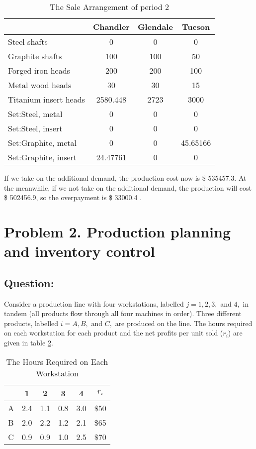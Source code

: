 \documentclass[12pt]{article}
\begin{document}
\begin{table}[H]
	\centering
	\setlength{\belowcaptionskip}{0.1cm}
	\caption{The Sale Arrangement of period 2}
	\label{tab22}
	\begin{tabular}{lccc}
		\hline
		\hline
		&Chandler&Glendale&	Tucson\\
		\hline
		Steel shafts& 0&0&0\\
		Graphite shafts& 100&100&50\\
		Forged iron heads&200&200&100\\
		Metal wood heads&30&30&15\\
		Titanium insert heads&2580.448&2723&3000\\
		Set:Steel, metal&0&0&0\\
		Set:Steel, insert&0&0&0\\
		Set:Graphite, metal&0&0&45.65166\\
		Set:Graphite, insert&24.47761&0&0\\
		\hline
		\hline
	\end{tabular}
\end{table}
\noindent If we take on the additional demand, the production cost now is \$ 535457.3. At the meanwhile, if we not take on the additional demand, the production will cost \$ 502456.9, so the overpayment is \$ 33000.4 .
	\section{Problem 2. Production planning and inventory control}
	\subsection{Question:}

	\noindent Consider a production line with four workstations, labelled $j = 1, 2, 3,$ and $4,$ in tandem (all products flow through all four machines in order). Three different products, labelled $i = A, B,$ and $C,$ are produced on the line. The hours required on each workstation for each product and the net profits per unit sold ($r_i$) are given in table \ref{tab8}.
	\begin{table}[H]
		\centering
		\setlength{\belowcaptionskip}{0.1cm}
		\caption{The Hours Required on Each Workstation }
		\label{tab8}
		\begin{tabular}{cccccc}
			\hline
			\hline
			&1&2&3&4&$r_i$\\
			\hline
			A&2.4&1.1&0.8&3.0&\$50\\
			B&2.0&2.2&1.2&2.1&\$65\\
			C&0.9&0.9&1.0&2.5&\$70\\	
			\hline
			\hline
		\end{tabular}
	\end{table}
\end{document}
